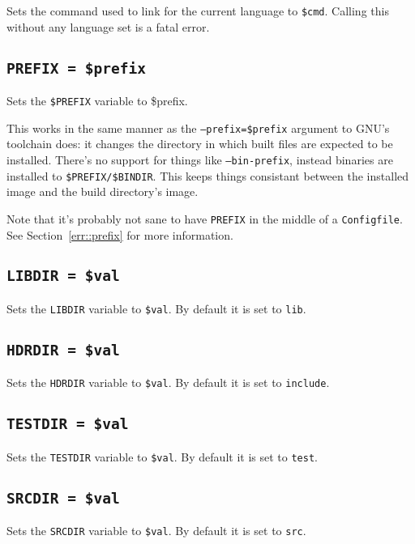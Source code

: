 \documentclass{article}
\begin{document}
Sets the command used to link for the current language to
\texttt{\$cmd}.  Calling this without any language set is a fatal
error.

\subsection{\texttt{PREFIX = \$prefix}}

Sets the \texttt{\$PREFIX} variable to \$prefix.

This works in the same manner as the \texttt{--prefix=\$prefix}
argument to GNU's toolchain does: it changes the directory in which
built files are expected to be installed.  There's no support for
things like \texttt{--bin-prefix}, instead binaries are installed to
\texttt{\$PREFIX/\$BINDIR}.  This keeps things consistant between the
installed image and the build directory's image.

Note that it's probably not sane to have \texttt{PREFIX} in the middle
of a \texttt{Configfile}.  See Section~\ref{err::prefix} for more
information.

\subsection{\texttt{LIBDIR = \$val}}

Sets the \texttt{LIBDIR} variable to \texttt{\$val}.  By default it is
set to \texttt{lib}.

\subsection{\texttt{HDRDIR = \$val}}

Sets the \texttt{HDRDIR} variable to \texttt{\$val}.  By default it is
set to \texttt{include}.

\subsection{\texttt{TESTDIR = \$val}}

Sets the \texttt{TESTDIR} variable to \texttt{\$val}.  By default it is
set to \texttt{test}.

\subsection{\texttt{SRCDIR = \$val}}

Sets the \texttt{SRCDIR} variable to \texttt{\$val}.  By default it is
set to \texttt{src}.
\end{document}
